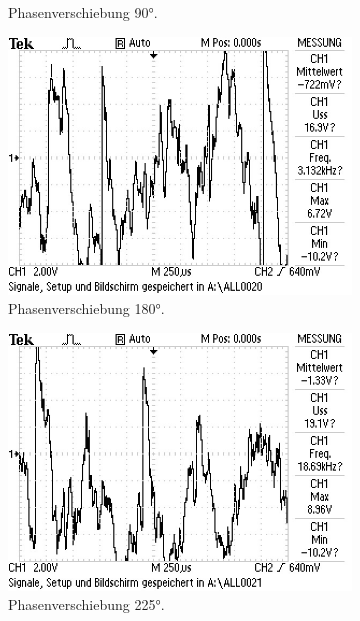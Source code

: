 \begin{figure}
\begin{subfigure}{0.48\textwidth}
 \caption{Phasenverschiebung 90°.}
   \label{fig:2}
 \end{subfigure}
 \begin{subfigure}{0.48\textwidth}
   \centering
   \includegraphics[width=\textwidth]{bilder/Mit Rauschen/3.JPG}
 \caption{Phasenverschiebung 180°.}
   \label{fig:3}
 \end{subfigure}
 \begin{subfigure}{0.48\textwidth}
   \centering
   \includegraphics[width=\textwidth]{bilder/Mit Rauschen/4.JPG}
 \caption{Phasenverschiebung 225°.}
   \label{fig:4}
 \end{subfigure}
 \begin{subfigure}{0.48\textwidth}
   \centering

\end{subfigure}
\end{figure}

